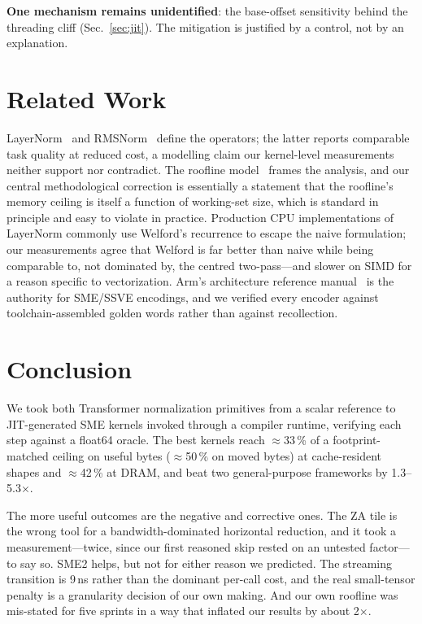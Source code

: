 \documentclass[conference,10pt]{IEEEtran}
\begin{document}
\textbf{One mechanism remains unidentified}: the base-offset sensitivity behind
the threading cliff (Sec.~\ref{sec:jit}). The mitigation is justified by a
control, not by an explanation.

\section{Related Work}

LayerNorm~\cite{ba2016layernorm} and RMSNorm~\cite{zhang2019rmsnorm} define the
operators; the latter reports comparable task quality at reduced cost, a
modelling claim our kernel-level measurements neither support nor contradict.
The roofline model~\cite{williams2009roofline} frames the analysis, and our
central methodological correction is essentially a statement that the roofline's
memory ceiling is itself a function of working-set size, which is standard in
principle and easy to violate in practice. Production CPU implementations of
LayerNorm commonly use Welford's recurrence to escape the naive formulation;
our measurements agree that Welford is far better than naive while being
comparable to, not dominated by, the centred two-pass---and slower on SIMD for a
reason specific to vectorization. Arm's architecture reference
manual~\cite{armarm} is the authority for SME/SSVE encodings, and we verified
every encoder against toolchain-assembled golden words rather than against
recollection.

\section{Conclusion}

We took both Transformer normalization primitives from a scalar reference to
JIT-generated SME kernels invoked through a compiler runtime, verifying each
step against a float64 oracle. The best kernels reach $\approx$33\,\% of a
footprint-matched ceiling on useful bytes ($\approx$50\,\% on moved bytes) at
cache-resident shapes and $\approx$42\,\% at DRAM, and beat two general-purpose
frameworks by 1.3--5.3$\times$.

The more useful outcomes are the negative and corrective ones. The ZA tile is
the wrong tool for a bandwidth-dominated horizontal reduction, and it took a
measurement---twice, since our first reasoned skip rested on an untested
factor---to say so. SME2 helps, but not for either reason we predicted. The
streaming transition is 9\,ns rather than the dominant per-call cost, and the
real small-tensor penalty is a granularity decision of our own making. And our
own roofline was mis-stated for five sprints in a way that inflated our results
by about 2$\times$.
\end{document}
